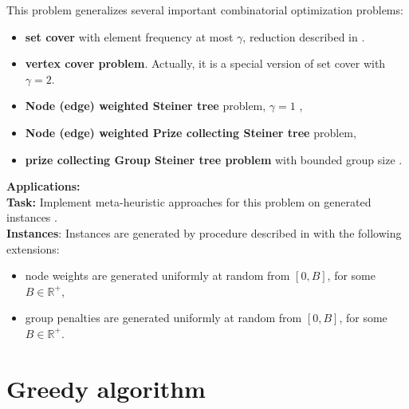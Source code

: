 \documentclass[a4paper,11pt]{article}
\begin{document}
This problem generalizes several important combinatorial optimization problems:
\begin{itemize}
    \item \textbf{set cover} with element frequency at most $\gamma$, reduction described in \cite{gargPolylogarithmicApproximationAlgorithm2000}.
    \item \textbf{vertex cover problem}. Actually, it is a special version of set cover with $\gamma = 2$.
    \item \textbf{Node (edge) weighted Steiner tree} problem, $\gamma = 1$  \cite{kleinNearlyBestPossibleApproximation1995},
    \item \textbf{Node (edge) weighted Prize collecting Steiner tree} problem,
    \item \textbf{prize collecting Group Steiner tree problem} with bounded group size \cite{glicksmanApproximationAlgorithmsGroup2008}.
\end{itemize}

\noindent\textbf{Applications:} \cite{faustPathwayDiscoveryMetabolic2010,sunPhysaruminspiredPrizecollectingSteiner2016,zhangPrioritizationCancerDriver2022}\\
\textbf{Task:} Implement meta-heuristic approaches for this problem on generated instances \cite{matijevicGeneralVariableNeighborhood2022}.\\
\textbf{Instances}: Instances are generated by procedure described in \cite{matijevicGeneralVariableNeighborhood2022} with the following extensions:
\begin{itemize}
    \item node weights are generated uniformly at random from $[0,B]$, for some $B\in\mathbb{R}^+$,
    \item group penalties are generated uniformly at random from $[0,B]$, for some $B\in\mathbb{R}^+$.
\end{itemize}

\section{Greedy algorithm}
\end{document}
